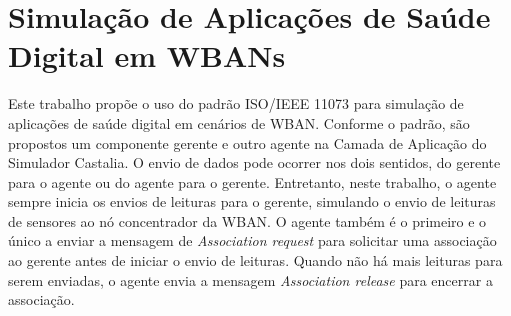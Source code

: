 \section{Simulação de Aplicações de Saúde Digital em WBANs}\label{castaliaapplayer}

Este trabalho propõe o uso do padrão ISO/IEEE 11073 para simulação de aplicações de saúde digital em cenários de WBAN. Conforme o padrão, são propostos um componente gerente e outro agente na Camada de Aplicação do Simulador Castalia. 
O envio de dados pode ocorrer nos dois sentidos, do gerente para o agente ou do agente para o gerente.
Entretanto, neste trabalho, o agente sempre inicia os envios de leituras para o gerente, simulando o envio de leituras de sensores ao nó concentrador da WBAN. O agente também é o primeiro e o único a enviar a mensagem de \textit{Association request} para solicitar uma associação ao gerente antes de iniciar o envio de leituras. Quando não há mais leituras para serem enviadas, o agente envia a mensagem \textit{Association release} para encerrar a associação. 

